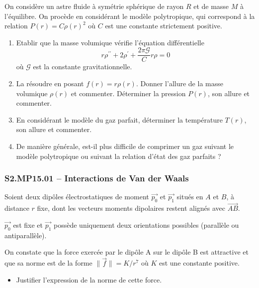 On considère un astre fluide à symétrie sphérique de rayon $R$ et de masse $M$ à l'équilibre. On procède en considérant le modèle polytropique, qui correspond à la relation $P(r) = C \rho(r)^{2}$ où $C$ est une constante strictement positive.


\begin{enumerate}
\item Etablir que la masse volumique vérifie l'équation différentielle
$$
r \rho^{\prime \prime}+2 \rho^{\prime}+\frac{2 \pi \mathcal{G}}{C} r \rho=0
$$
où $\mathcal{G}$ est la constante gravitationnelle.
\item  La résoudre en posant $f(r)=r \rho(r)$. Donner l'allure de la masse volumique $\rho(r)$ et commenter. Déterminer la pression $P(r)$, son allure et commenter.
\item En considérant le modèle du gaz parfait, déterminer la température $T(r)$, son allure et commenter.
\item  De manière générale, est-il plus difficile de comprimer un gaz suivant le modèle polytropique ou suivant la relation d'état des gaz parfaits ?
\end{enumerate}

\subsubsection*{S2.MP15.01 -- Interactions de Van der Waals  \corrige}

Soient deux dipôles électrostatiques de moment $\vec{p_0}$ et $\vec{p_1}$ situés en $A$ et $B$, à distance $r$ fixe, dont les vecteurs moments dipolaires restent alignés avec $\vec{AB}$.

$\vec{p_0}$ est fixe et $\vec{p_1}$ possède uniquement deux orientations possibles (parallèle ou antiparallèle).

On constate que la force exercée par le dipôle A sur le dipôle B est attractive et que sa norme est de la forme $\|\vec{f}\| = K/r^{7}$ où $K$ est une constante positive.

\begin{itemize}[label=\textbullet]
\item Justifier l'expression de la norme de cette force.
\end{itemize}



